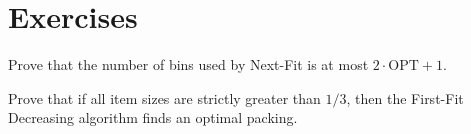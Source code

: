 \section{Exercises}
\begin{exercise}
Prove that the number of bins used by Next-Fit is at most $2 \cdot \text{OPT} + 1$.
\end{exercise}
\begin{exercise}
Prove that if all item sizes are strictly greater than $1/3$, then the First-Fit Decreasing algorithm finds an optimal packing.
\end{exercise}

